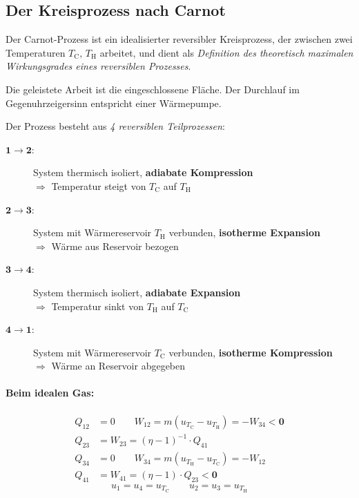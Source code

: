 	\subsection{Der Kreisprozess nach Carnot} %
		Der Carnot-Prozess ist ein idealisierter reversibler Kreisprozess, der zwischen zwei Temperaturen $T_\text{C},\,T_\text{H}$ arbeitet, und dient als \emph{Definition des theoretisch maximalen Wirkungsgrades eines reversiblen Prozesses}.
		
		
		Die geleistete Arbeit ist die eingeschlossene Flä\-che. Der Durchlauf im Gegenuhrzeigersinn entspricht einer Wär\-me\-pum\-pe.
		
		Der Prozess besteht aus \emph{4 reversiblen Teilprozessen}:
		\begin{description}
			\item[$\mathbf{1 \to 2}$:] System thermisch isoliert, \textbf{adiabate Kompression} \\ $\Rightarrow$ Temperatur steigt von $T_\text{C}$ auf $T_\text{H}$
			\item[$\mathbf{2 \to 3}$:] System mit Wärmereservoir $T_\text{H}$ verbunden, \textbf{isotherme Expansion} \\ $\Rightarrow$ Wärme aus Reservoir bezogen
			\item[$\mathbf{3 \to 4}$:] System thermisch isoliert, \textbf{adiabate Expansion} \\ $\Rightarrow$ Temperatur sinkt von $T_\text{H}$ auf $T_\text{C}$
			\item[$\mathbf{4 \to 1}$:] System mit Wärmereservoir $T_\text{C}$ verbunden, \textbf{isotherme Kompression} \\ $\Rightarrow$ Wärme an Reservoir abgegeben
		\end{description}
		
		\paragraph{Beim idealen Gas:} %
			\begin{align*}
				Q_{12} &= 0 \qquad W_{12} = m(u_{T_\text{C}} - u_{T_\text{H}}) = -W_{34} \boldsymbol{ < 0} \\
				Q_{23} &= W_{23} = (\eta - 1)^{-1} \cdot Q_{41} \\
				Q_{34} &= 0 \qquad W_{34} = m(u_{T_\text{H}} - u_{T_\text{C}}) = -W_{12} \\
				Q_{41} &= W_{41} = (\eta - 1) \cdot Q_{23}  \boldsymbol{ < 0}
			\end{align*}
			\[
				u_1 = u_4 = u_{T_\text{C}} \qquad 
				u_2 = u_3 = u_{T_\text{H}}
			\]
			
